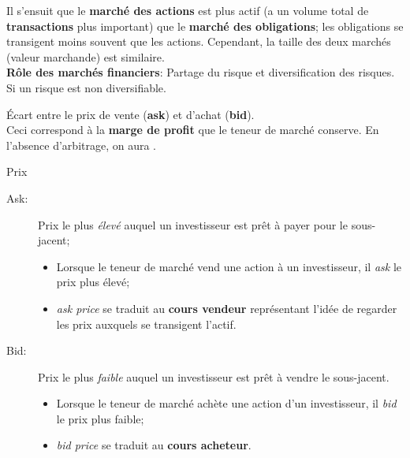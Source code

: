 \documentclass[10pt, french]{article}
\begin{document}
\begin{multicols*}{2}
Il s'ensuit que le \textbf{marché des actions} est plus actif (a un volume total de \textbf{transactions} plus important) que le \textbf{marché des obligations}; les obligations se transigent moins souvent que les actions. Cependant, la taille des deux marchés (valeur marchande) est similaire.\\

\textbf{Rôle des marchés financiers}: Partage du risque et diversification des risques. Si un risque est non diversifiable.\\

\begin{definitionNOHFILL}
Écart entre le prix de vente (\textbf{ask}) et d'achat (\textbf{bid}).\\

Ceci correspond à la \textbf{marge de profit} que le teneur de marché conserve. En l'absence d'arbitrage, on aura .

\begin{conceptgen}{Prix}
\begin{description}
	\item[Ask:] Prix le plus \textit{élevé} auquel un investisseur est prêt à payer pour le sous-jacent;
		\begin{itemize}[leftmargin = *]
		\item	Lorsque le teneur de marché vend une action à un investisseur, il \textit{ask} le prix plus élevé;
		\item	\og \textit{ask price} \fg{} se traduit au \textbf{cours vendeur} représentant l'idée de regarder les prix auxquels se transigent l'actif.
		\end{itemize}
	\item[Bid:] Prix le plus \textit{faible} auquel un investisseur est prêt à vendre le sous-jacent.
		\begin{itemize}[leftmargin = *]
		\item	Lorsque le teneur de marché achète une action d'un investisseur, il \textit{bid} le prix plus faible;
		\item	\og \textit{bid price} \fg{} se traduit au \textbf{cours acheteur}.
		\end{itemize}
\end{description}

\end{conceptgen}

\end{definitionNOHFILL}


\end{multicols*}
\end{document}
